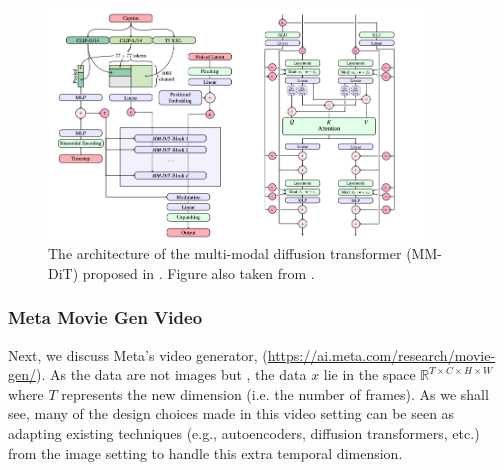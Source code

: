 \begin{figure}[!t]
    \centering
    \includegraphics[width=0.9\textwidth]{figures/mmdit.png}
    \caption{The architecture of the multi-modal diffusion transformer (MM-DiT) proposed in \citep{sd3}. Figure also taken from \citep{sd3}.}
    \label{fig:mmdit}
\end{figure}


\subsubsection{Meta Movie Gen Video}
Next, we discuss Meta's video generator,  (\url{https://ai.meta.com/research/movie-gen/}). As the data are not images but ,  the data $x$ lie in the space $\mathbb{R}^{T \times C \times H \times W}$ where $T$ represents the new  dimension (i.e. the number of frames). As we shall see, many of the design choices made in this video setting can be seen as adapting existing techniques (e.g., autoencoders, diffusion transformers, etc.) from the image setting to handle this extra temporal dimension.\\

